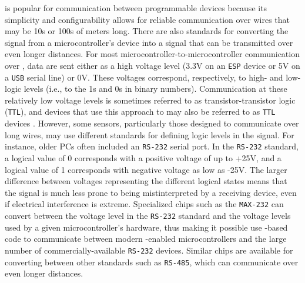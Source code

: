 \uart is popular for communication between programmable devices because its simplicity and configurability allows for reliable communication over wires that may be 10s or 100s of meters long.
There are also standards for converting the signal from a microcontroller's \uart device into a signal that can be transmitted over even longer distances.
For most microcontroller-to-microcontroller communication over \uart, data are sent either as a high voltage level (3.3V on an \texttt{ESP} device or 5V on a \texttt{USB} serial line) or 0V.
These voltages correspond, respectively, to high- and low- logic levels (i.e., to the 1s and 0s in binary numbers).
Communication at these relatively low voltage levels is sometimes referred to as transistor-transistor logic (\texttt{TTL}), and devices that use this approach to \uart may also be referred to as \texttt{TTL} devices
.
However, some sensors, particularly those designed to communicate over long wires, may use different standards for defining logic levels in the signal.
For instance, older PCs often included an \texttt{RS-232} serial port.
In the \texttt{RS-232} standard, a logical value of 0 corresponds with a positive voltage of up to +25V, and a logical value of 1 corresponds with negative voltage as low as -25V.
The larger difference between voltages representing the different logical states means that the signal is much less prone to being mistinterpreted by a receiving device, even if electrical interference is extreme.
Specialized chips such as the \texttt{MAX-232} can convert between the voltage level in the \texttt{RS-232} standard and the voltage levels used by a given microcontroller's \uart hardware, thus making it possible use \uart -based code to communicate between modern \uart -enabled microcontrollers and the large number of commercially-available \texttt{RS-232} devices.
Similar chips are available for converting between other standards such as \texttt{RS-485}, which can communicate over even longer distances.

